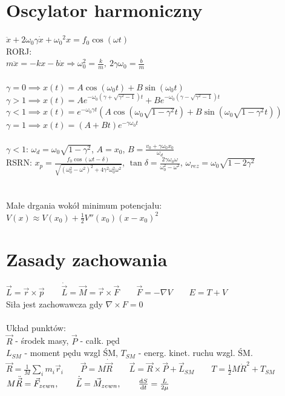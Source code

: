 \documentclass[10pt,a4paper,twocolumn]{article}
\begin{document}
\section{Oscylator harmoniczny}
$\ddot x + 2\omega_0 \gamma \dot x + {\omega_0}^2 x = f_0 \cos \left(\omega t \right)$ \\
RORJ: \\
$m\ddot x = -kx - b\dot x \Rightarrow \omega_0^2 = \frac km,\ 2\gamma\omega_0 = \frac bm$ \\
\\
$\gamma = 0 \implies x(t) = A \cos\left(\omega_0 t\right) + B \sin \left(\omega_0 t\right)$ \\
$\gamma > 1 \implies x(t) = A e^{-\omega_0 \left(\gamma + \sqrt{\gamma^2 - 1}\right)t} + B e^{-\omega_0 \left(\gamma - \sqrt{\gamma^2 - 1}\right)t}$ \\
$\gamma < 1 \implies x(t) = e^{-\omega_0 \gamma t} \left(A\cos\left(\omega_0 \sqrt{1-\gamma^2}t\right) + B\sin\left(\omega_0 \sqrt{1-\gamma^2}t\right)\right)$ \\
$\gamma = 1 \implies x(t) = (A+Bt) e^{-\gamma \omega_0 t}$ \\
\\
$\gamma<1$: $\omega_d = \omega_0\sqrt{1-\gamma^2}$, $A = x_0$, $B = \frac{v_0+\gamma\omega_0x_0}{\omega_d}$ \\
RSRN: $x_p = \frac{f_0\cos(\omega t-\delta)}{\sqrt{(\omega_0^2-\omega^2)^2+4\gamma^2\omega_0^2\omega^2}}$, $\tan\delta = \frac{2\gamma\omega_0\omega}{\omega_0^2-\omega^2}$, $\omega_{rez} = \omega_0\sqrt{1-2\gamma^2}$ \\
\\ \\
Małe drgania wokół minimum potencjału:
$V(x) \approx V(x_0) + \frac1 2 V''(x_0)(x-x_0)^2$\\

\section{Zasady zachowania}
$\vec L = \vec r \times \vec p \qquad \dot{\vec L} = \vec M = \vec r \times \vec F \qquad \vec F = -\nabla{V} \qquad E = T + V$ \\
Siła jest zachowawcza gdy $\nabla \times F = 0$ \\ 
\\Układ punktów:\\
$\vec R$ - środek masy, $\vec P$ - całk. pęd \\
$L_{SM}$ - moment pędu wzgl ŚM, $T_{SM}$ - energ. kinet. ruchu wzgl. ŚM. \\
$\vec R = \frac{1}{M}\sum_i m_i \vec r_i \qquad \vec P = M \dot{\vec R} \qquad \vec L = \vec R \times \vec P + \vec L_{SM} \qquad T = \frac1 2 M \dot R^2 + T_{SM}$ 
$M\ddot{\vec R} = \vec F_{zewn}, \qquad \dot{\vec L} = \vec M_{zewn}, \qquad \frac{\text dS}{\text dt} = \frac{L}{2\mu}$
\end{document}

